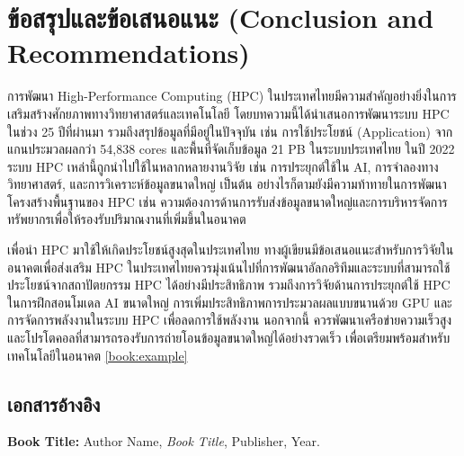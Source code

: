 \documentclass[a4paper,12pt]{extarticle}
\begin{document}
\newpage

\section{ข้อสรุปและข้อเสนอแนะ (Conclusion and Recommendations)}
การพัฒนา High-Performance Computing (HPC) ในประเทศไทยมีความสำคัญอย่างยิ่งในการเสริมสร้างศักยภาพทางวิทยาศาสตร์และเทคโนโลยี โดยบทความนี้ได้นำเสนอการพัฒนาระบบ HPC ในช่วง 25 ปีที่ผ่านมา รวมถึงสรุปข้อมูลที่มีอยู่ในปัจจุบัน เช่น การใช้ประโยชน์ (Application) จากแกนประมวลผลกว่า 54,838 cores และพื้นที่จัดเก็บข้อมูล 21 PB ในระบบประเทศไทย ในปี 2022 ระบบ HPC เหล่านี้ถูกนำไปใช้ในหลากหลายงานวิจัย เช่น การประยุกต์ใช้ใน AI, การจำลองทางวิทยาศาสตร์, และการวิเคราะห์ข้อมูลขนาดใหญ่ เป็นต้น อย่างไรก็ตามยังมีความท้าทายในการพัฒนาโครงสร้างพื้นฐานของ HPC เช่น ความต้องการด้านการรับส่งข้อมูลขนาดใหญ่และการบริหารจัดการทรัพยากรเพื่อให้รองรับปริมาณงานที่เพิ่มขึ้นในอนาคต

เพื่อนำ HPC มาใช้ให้เกิดประโยชน์สูงสุดในประเทศไทย ทางผู้เขียนมีข้อเสนอแนะสำหรับการวิจัยในอนาคตเพื่อส่งเสริม HPC ในประเทศไทยควรมุ่งเน้นไปที่การพัฒนาอัลกอริทึมและระบบที่สามารถใช้ประโยชน์จากสถาปัตยกรรม HPC ได้อย่างมีประสิทธิภาพ รวมถึงการวิจัยด้านการประยุกต์ใช้ HPC ในการฝึกสอนโมเดล AI ขนาดใหญ่ การเพิ่มประสิทธิภาพการประมวลผลแบบขนานด้วย GPU และการจัดการพลังงานในระบบ HPC เพื่อลดการใช้พลังงาน นอกจากนี้ ควรพัฒนาเครือข่ายความเร็วสูงและโปรโตคอลที่สามารถรองรับการถ่ายโอนข้อมูลขนาดใหญ่ได้อย่างรวดเร็ว เพื่อเตรียมพร้อมสำหรับเทคโนโลยีในอนาคต \ref{book:example}

\newpage

\begin{center}
\section*{เอกสารอ้างอิง}
\end{center}

	\begin{enumerate} [label={[\arabic*]}]
		\item \textbf{Book Title:} Author Name, \textit{Book Title}, Publisher, Year. \label{book:example}
	\end{enumerate}
\end{document}
